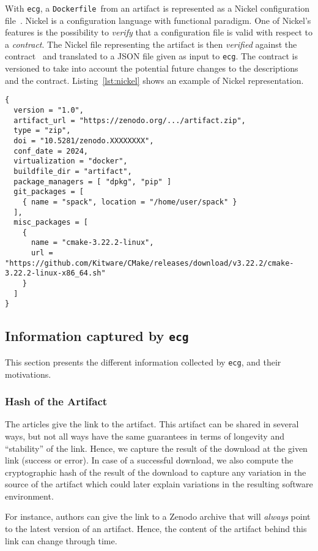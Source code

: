\documentclass[sigconf,natbib=false]{acmart}
\newcommand{\df}{\texttt{Dockerfile}}
\newcommand{\ecg}{\texttt{ecg}}
\begin{document}
With \ecg, a \df\ from an artifact is represented as a Nickel configuration file~\cite{nickel}.
Nickel is a configuration language with functional paradigm.
One of Nickel's features is the possibility to \emph{verify} that a configuration file is valid with respect to a \emph{contract}.
The Nickel file representing the artifact is then \emph{verified} against the contract~\cite{ecg_contract} and translated to a JSON file given as input to \ecg.
The contract is versioned to take into account the potential future changes to the descriptions and the contract.
Listing~\ref{lst:nickel} shows an example of Nickel representation.

\begin{lstlisting}[caption=Example of Artifact Nickel representation, label=lst:nickel]
{
  version = "1.0",
  artifact_url = "https://zenodo.org/.../artifact.zip",
  type = "zip",
  doi = "10.5281/zenodo.XXXXXXXX",
  conf_date = 2024,
  virtualization = "docker",
  buildfile_dir = "artifact",
  package_managers = [ "dpkg", "pip" ]
  git_packages = [
    { name = "spack", location = "/home/user/spack" }
  ],
  misc_packages = [
    {
      name = "cmake-3.22.2-linux",
      url = "https://github.com/Kitware/CMake/releases/download/v3.22.2/cmake-3.22.2-linux-x86_64.sh"
    }
  ]
}
\end{lstlisting}


\subsection{Information captured by \ecg}\label{sec:ecg:capture}

This section presents the different information collected by \ecg, and their motivations.

\subsubsection{Hash of the Artifact}

The articles give the link to the artifact.
This artifact can be shared in several ways, but not all ways have the same guarantees in terms of longevity and ``stability'' of the link.
Hence, we capture the result of the download at the given link (success or error).
In case of a successful download, we also compute the cryptographic hash of the result of the download to capture any variation in the source of the artifact which could later explain variations in the resulting software environment.

For instance, authors can give the link to a Zenodo archive that will \emph{always} point to the latest version of an artifact.
Hence, the content of the artifact behind this link can change through time.
\end{document}
